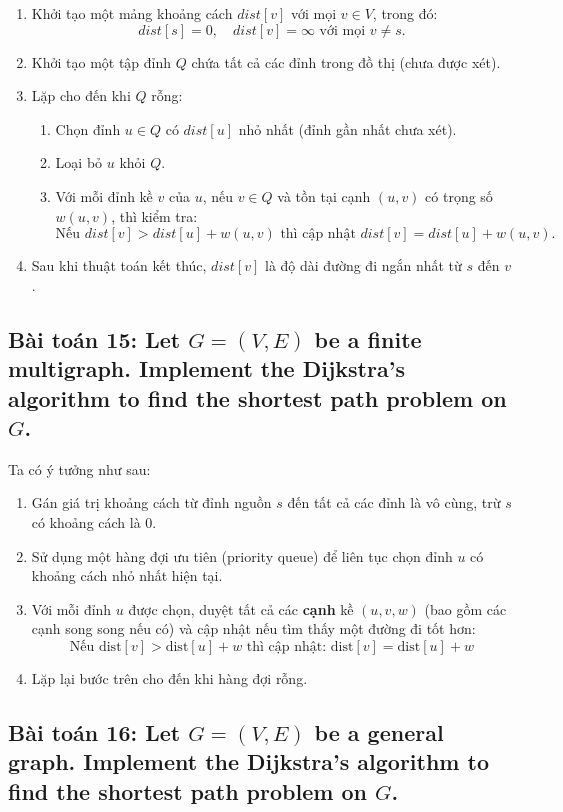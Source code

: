 \documentclass{article}
\begin{document}
	\begin{enumerate}
		\item Khởi tạo một mảng khoảng cách $dist[v]$ với mọi $v \in V$, trong đó:
		\[
		dist[s] = 0, \quad dist[v] = \infty \text{ với mọi } v \neq s.
		\]
		\item Khởi tạo một tập đỉnh $Q$ chứa tất cả các đỉnh trong đồ thị (chưa được xét).
		\item Lặp cho đến khi $Q$ rỗng:
		\begin{enumerate}
			\item Chọn đỉnh $u \in Q$ có $dist[u]$ nhỏ nhất (đỉnh gần nhất chưa xét).
			\item Loại bỏ $u$ khỏi $Q$.
			\item Với mỗi đỉnh kề $v$ của $u$, nếu $v \in Q$ và tồn tại cạnh $(u, v)$ có trọng số $w(u, v)$, thì kiểm tra:
			\[
			\text{Nếu } dist[v] > dist[u] + w(u, v) \text{ thì cập nhật } dist[v] = dist[u] + w(u, v).
			\]
		\end{enumerate}
		\item Sau khi thuật toán kết thúc, $dist[v]$ là độ dài đường đi ngắn nhất từ $s$ đến $v$.
	\end{enumerate}
	
	\subsection*{Bài toán 15: Let $G = (V,E)$ be a finite multigraph. Implement the Dijkstra's algorithm to find the shortest path problem on $G$.}
	
	Ta có ý tưởng như sau:
	
	\begin{enumerate}
		\item Gán giá trị khoảng cách từ đỉnh nguồn $s$ đến tất cả các đỉnh là vô cùng, trừ $s$ có khoảng cách là $0$.
		\item Sử dụng một hàng đợi ưu tiên (priority queue) để liên tục chọn đỉnh $u$ có khoảng cách nhỏ nhất hiện tại.
		\item Với mỗi đỉnh $u$ được chọn, duyệt tất cả các \textbf{cạnh} kề $(u,v,w)$ (bao gồm các cạnh song song nếu có) và cập nhật nếu tìm thấy một đường đi tốt hơn:
		\[
		\text{Nếu } \text{dist}[v] > \text{dist}[u] + w \text{ thì cập nhật: } \text{dist}[v] = \text{dist}[u] + w
		\]
		\item Lặp lại bước trên cho đến khi hàng đợi rỗng.
	\end{enumerate}
	
	\subsection*{Bài toán 16: Let $G = (V,E)$ be a general graph. Implement the Dijkstra's algorithm to find the shortest path problem on $G$.}
	
\end{document}
